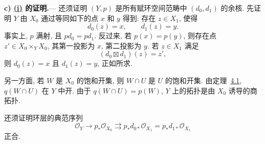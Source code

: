 \medskip
{}\label{par:sga3-V-6-c}%
\noindent\textbf{c) \hyperref[lem:sga3-V-6.1-i]{(i)} 的证明.}---%
还须证明 \((Y,p)\) 是所有赋环空间范畴中 \((d_0,d_1)\) 的余核.
先证明 \(Y\) 由 \(X_0\) 通过等同如下的点 \(x\) 和 \(y\) 得到:
存在 \(z\in X_1\), 使得
\[
  d_0(z)=x,\qquad d_1(z)=y.
\]
事实上, \(p\) 满射, 且 \(p d_0=p d_1\).
反过来, 若 \(p(x)=p(y)\), 则存在点 \(z'\in X_0\times_Y X_0\),
其第一投影为 \(x\), 第二投影为 \(y\).
若 \(z\in X_1\) 满足
\[
  (d_0\boxtimes d_1)(z)=z',
\]
则 \(d_0(z)=x\) 且 \(d_1(z)=y\), 正如所求.

另一方面, 若 \(W\) 是 \(X_0\) 的饱和开集,
则 \(W\cap U\) 是 \(U\) 的饱和开集.
由定理~\hyperref[thm:sga3-V-4.1]{4.1}, \(q(W\cap U)\) 在 \(Y\) 中开.
由于 \(q(W\cap U)=p(W)\), \(Y\) 上的拓扑是由 \(X_0\) 诱导的商拓扑.

还须证明环层的典范序列
\begin{equation}
  \mathcal O_Y
  \longrightarrow p_\ast\mathcal O_{X_0}
  \rightrightarrows
  p_\ast d_{0\ast}\mathcal O_{X_1}
  =
  p_\ast d_{1\ast}\mathcal O_{X_1}
  \label{eq:sga3-V-6.1-sheaf-exactness}
\end{equation}
正合.

